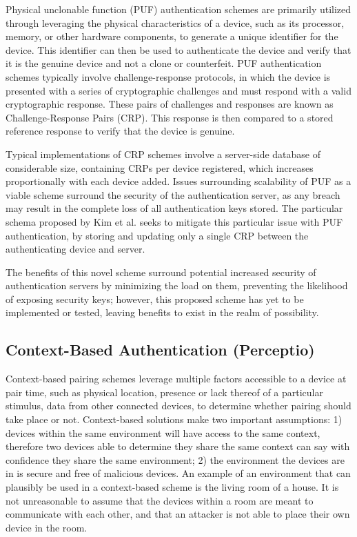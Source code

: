 \documentclass[10pt,twocolumn,letterpaper]{article}
\begin{document}
Physical unclonable function (PUF) authentication schemes are primarily utilized through leveraging the physical characteristics of a device, such as its processor, memory, or other hardware components, to generate a unique identifier for the device. This identifier can then be used to authenticate the device and verify that it is the genuine device and not a clone or counterfeit. PUF authentication schemes typically involve challenge-response protocols, in which the device is presented with a series of cryptographic challenges and must respond with a valid cryptographic response. These pairs of challenges and responses are known as Challenge-Response Pairs (CRP). This response is then compared to a stored reference response to verify that the device is genuine.

Typical implementations of CRP schemes involve a server-side database of considerable size, containing CRPs per device registered, which increases proportionally with each device added. Issues surrounding scalability of PUF as a viable scheme surround the security of the authentication server, as any breach may result in the complete loss of all authentication keys stored. The particular schema proposed by Kim et al. \cite{puf} seeks to mitigate this particular issue with PUF authentication, by storing and updating only a single CRP between the authenticating device and server.

The benefits of this novel scheme surround potential increased security of authentication servers by minimizing the load on them, preventing the likelihood of exposing security keys; however, this proposed scheme has yet to be implemented or tested, leaving benefits to exist in the realm of possibility.

\subsection{Context-Based Authentication (Perceptio)}

Context-based pairing schemes leverage multiple factors accessible to a device at pair time, such as physical location, presence or lack thereof of a particular stimulus, data from other connected devices, to determine whether pairing should take place or not. Context-based solutions make two important assumptions: 1) devices within the same environment will have access to the same context, therefore two devices able to determine they share the same context can say with confidence they share the same environment; 2) the environment the devices are in is secure and free of malicious devices. An example of an environment that can plausibly be used in a context-based scheme is the living room of a house. It is not unreasonable to assume that the devices within a room are meant to communicate with each other, and that an attacker is not able to place their own device in the room.
\end{document}
